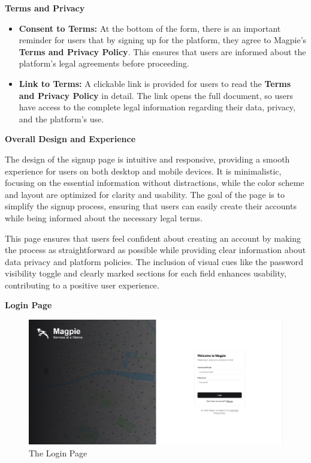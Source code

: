 \textbf{Terms and Privacy}

\begin{itemize}
    \item{} \textbf{Consent to Terms:} At the bottom of the form, there is an important reminder for users that by signing up for the platform, they agree to Magpie's \textbf{Terms and Privacy Policy}. This ensures that users are informed about the platform’s legal agreements before proceeding. 
    \item{} \textbf{Link to Terms:} A clickable link is provided for users to read the \textbf{Terms and Privacy Policy} in detail. The link opens the full document, so users have access to the complete legal information regarding their data, privacy, and the platform's use.
\end{itemize}

\textbf{Overall Design and Experience}

The design of the signup page is intuitive and responsive, providing a smooth experience for users on both desktop and mobile devices. It is minimalistic, focusing on the essential information without distractions, while the color scheme and layout are optimized for clarity and usability. The goal of the page is to simplify the signup process, ensuring that users can easily create their accounts while being informed about the necessary legal terms.

This page ensures that users feel confident about creating an account by making the process as straightforward as possible while providing clear information about data privacy and platform policies. The inclusion of visual cues like the password visibility toggle and clearly marked sections for each field enhances usability, contributing to a positive user experience.



\newpage{}

\textbf{Login Page}

\begin{figure}[h]
    \centering{}
    \includegraphics[width=1\textwidth]{images/site/login/login_page.png}
    \caption{The Login Page}
\end{figure}

